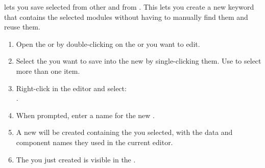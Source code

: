 
\app{} lets you save selected \gdcases{} from other \gdcases{} and from \gdsuites{}. This lets you create a new keyword that contains the selected modules without having to manually find them and reuse them. 

\begin{enumerate}
\item Open the \gdtestcaseeditor{} or \gdtestsuiteeditor{} by double-clicking on the \gdcase{} or \gdsuite{} you  want to edit. 
\item Select the \gdcases{} you want to save into the new \gdcase{}  by single-clicking them. Use 
   to select more than one item. 
\item Right-click in the editor and  select: \\
.
\item When prompted, enter a name for the new \gdcase{}. 
\item A new \gdcase{} will be created containing the \gdcases{} you selected, with the data and component names they used in the current editor.  
\item The \gdcase{} you just created is visible in the \gdtestcasebrowser{}. 
\end{enumerate}
